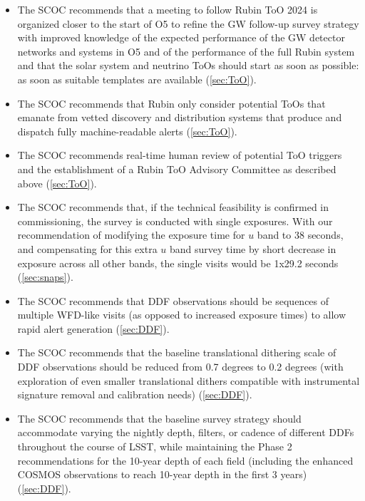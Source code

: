 \begin{itemize}
\item The SCOC recommends that a meeting to follow Rubin ToO 2024 is organized closer to the start of O5 to refine the GW follow-up survey strategy with improved knowledge of the expected performance of the GW detector networks and systems in O5 and of the performance of the full Rubin system and that the solar system and neutrino ToOs should start as soon as possible: as soon as suitable templates are available (\autoref{sec:ToO}).

\item The SCOC recommends that Rubin only consider potential ToOs that emanate from vetted discovery and distribution systems that produce and dispatch fully machine-readable alerts (\autoref{sec:ToO}).

\item The SCOC recommends real-time human review of potential ToO triggers and the establishment of a Rubin ToO Advisory Committee as described above (\autoref{sec:ToO}).

\item The SCOC recommends that, if the technical feasibility is confirmed in commissioning, the survey is conducted with single exposures. With our recommendation of modifying the exposure time for $u$ band to 38 seconds, and compensating for this extra $u$ band survey time by short decrease in exposure across all other bands, the single visits would be 1x29.2 seconds (\autoref{sec:snaps}).

\item The SCOC recommends that DDF observations should be sequences of multiple WFD-like visits (as opposed to increased exposure times) to allow rapid alert generation (\autoref{sec:DDF}).

\item The SCOC recommends that the baseline translational dithering scale of DDF observations should be reduced from 0.7 degrees to 0.2 degrees (with exploration of even smaller translational dithers compatible with instrumental signature removal and calibration needs) (\autoref{sec:DDF}).

\item The SCOC recommends that the baseline survey strategy should accommodate varying the nightly depth, filters, or cadence of different DDFs throughout the course of LSST, while maintaining the Phase 2 recommendations for the 10-year depth of each field (including the enhanced COSMOS observations to reach 10-year depth in the first 3 years) (\autoref{sec:DDF}).


\end{itemize}
